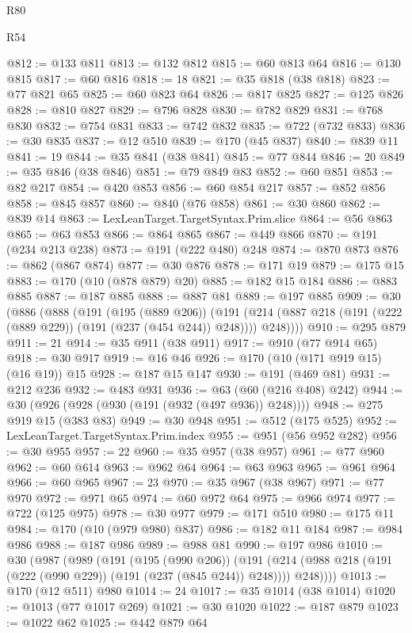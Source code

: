 \begin{lexlean}{R80}
\begin{lexlean}{R54}
\begin{coremodule}
{{{{{{{{{{{{{{{{{{{{{{{{{{{{{{{{{{{{{{{{{{{{{{{{{{@812 := @133 @811
@813 := @132 @812
@815 := @60 @813 @64
@816 := @130 @815
@817 := @60 @816
@818 := 18
@821 := @35 @818 (@38 @818)
@823 := @77 @821 @65
@825 := @60 @823 @64
@826 := @817 @825
@827 := @125 @826
@828 := @810 @827
@829 := @796 @828
@830 := @782 @829
@831 := @768 @830
@832 := @754 @831
@833 := @742 @832
@835 := @722 (@732 @833)
@836 := @30 @835
@837 := @12 @510
@839 := @170 (@45 @837)
@840 := @839 @11
@841 := 19
@844 := @35 @841 (@38 @841)
@845 := @77 @844
@846 := 20
@849 := @35 @846 (@38 @846)
@851 := @79 @849 @83
@852 := @60 @851
@853 := @82 @217
@854 := @420 @853
@856 := @60 @854 @217
@857 := @852 @856
@858 := @845 @857
@860 := @840 (@76 @858)
@861 := @30 @860
@862 := @839 @14
@863 := LexLeanTarget.TargetSyntax.Prim.slice
@864 := @56 @863
@865 := @63 @853
@866 := @864 @865
@867 := @449 @866
@870 := @191 (@234 @213 @238)
@873 := @191 (@222 @480) @248
@874 := @870 @873
@876 := @862 (@867 @874)
@877 := @30 @876
@878 := @171 @19
@879 := @175 @15
@883 := @170 (@10 (@878 @879) @20)
@885 := @182 @15 @184
@886 := @883 @885
@887 := @187 @885
@888 := @887 @81
@889 := @197 @885
@909 := @30
    (@886
      (@888
        (@191
          (@195 (@889 @206))
          (@191 (@214 (@887 @218 (@191 (@222 (@889 @229)) (@191 (@237 (@454 @244)) @248)))) @248))))
@910 := @295 @879
@911 := 21
@914 := @35 @911 (@38 @911)
@917 := @910 (@77 @914 @65)
@918 := @30 @917
@919 := @16 @46
@926 := @170 (@10 (@171 @919 @15) (@16 @19)) @15
@928 := @187 @15 @147
@930 := @191 (@469 @81)
@931 := @212 @236
@932 := @483 @931
@936 := @63 (@60 (@216 @408) @242)
@944 := @30 (@926 (@928 (@930 (@191 (@932 (@497 @936)) @248))))
@948 := @275 @919 @15 (@383 @83)
@949 := @30 @948
@951 := @512 (@175 @525)
@952 := LexLeanTarget.TargetSyntax.Prim.index
@955 := @951 (@56 @952 @282)
@956 := @30 @955
@957 := 22
@960 := @35 @957 (@38 @957)
@961 := @77 @960
@962 := @60 @614
@963 := @962 @64
@964 := @63 @963
@965 := @961 @964
@966 := @60 @965
@967 := 23
@970 := @35 @967 (@38 @967)
@971 := @77 @970
@972 := @971 @65
@974 := @60 @972 @64
@975 := @966 @974
@977 := @722 (@125 @975)
@978 := @30 @977
@979 := @171 @510
@980 := @175 @11
@984 := @170 (@10 (@979 @980) @837)
@986 := @182 @11 @184
@987 := @984 @986
@988 := @187 @986
@989 := @988 @81
@990 := @197 @986
@1010 := @30
    (@987
      (@989
        (@191
          (@195 (@990 @206))
          (@191 (@214 (@988 @218 (@191 (@222 (@990 @229)) (@191 (@237 (@845 @244)) @248)))) @248))))
@1013 := @170 (@12 @511) @980
@1014 := 24
@1017 := @35 @1014 (@38 @1014)
@1020 := @1013 (@77 @1017 @269)
@1021 := @30 @1020
@1022 := @187 @879
@1023 := @1022 @62
@1025 := @442 @879 @64
}}}}}}}}}}}}}}}}}}}}}}}}}}}}}}}}}}}}}}}}}}}}}}}}}}
\end{coremodule}
\end{lexlean}
\end{lexlean}
